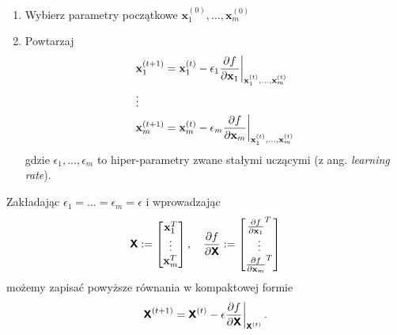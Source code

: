 \documentclass{myclass}
\begin{document}
\begin{tcolorbox}[title=Algorytm spadku wzdłuż gradientu]
\begin{enumerate}
    \item Wybierz parametry początkowe \(\mathbf{x}_1^{(0)}, \ldots, \mathbf{x}_m^{(0)}\)
    \item Powtarzaj
    \begin{equation*}
        \begin{split}
            &\mathbf{x}_1^{(t+1)} = \mathbf{x}_1^{(t)} - \epsilon_1\pdv{f}{\mathbf{x}_1}\bigg|_{\mathbf{x}_1^{(t)}, \ldots, \mathbf{x}_m^{(t)}}\\
            &\vdots\\
            &\mathbf{x}_m^{(t+1)} = \mathbf{x}_m^{(t)} - \epsilon_m\pdv{f}{\mathbf{x}_m}\bigg|_{\mathbf{x}_1^{(t)}, \ldots, \mathbf{x}_m^{(t)}}
        \end{split}
    \end{equation*}
    gdzie \(\epsilon_1,\ldots,\epsilon_m\) to hiper-parametry zwane stałymi uczącymi (z ang.
    \textit{learning rate}).
\end{enumerate}
\end{tcolorbox}

Zakładając \(\epsilon_1 = \ldots = \epsilon_m = \epsilon\) i wprowadzając
\begin{equation*}
    \oper{X} := \mqty[\mathbf{x}_1^T \\ \vdots \\ \mathbf{x}_m^T]\,,\quad \pdv{f}{\oper{X}} := \mqty[\pdv{f}{\mathbf{x}_1}^T \\ \vdots \\ \pdv{f}{\mathbf{x}_m}^T]
\end{equation*}
możemy zapisać powyższe równania w kompaktowej formie
\begin{equation*}
    \boldsymbol{\mathsf{X}}^{(t+1)} = \boldsymbol{\mathsf{X}}^{(t)} - \epsilon \pdv{f}{\boldsymbol{\mathsf{X}}}\bigg|_{\boldsymbol{\mathsf{X}}^{(t)}}\,.
\end{equation*}
\end{document}
